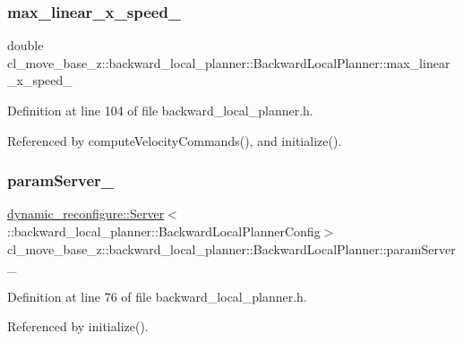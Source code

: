 \subsubsection{\texorpdfstring{max\+\_\+linear\+\_\+x\+\_\+speed\+\_\+}{max\_linear\_x\_speed\_}}
{\footnotesize\ttfamily double cl\+\_\+move\+\_\+base\+\_\+z\+::backward\+\_\+local\+\_\+planner\+::\+Backward\+Local\+Planner\+::max\+\_\+linear\+\_\+x\+\_\+speed\+\_\+\hspace{0.3cm}{\ttfamily [private]}}



Definition at line 104 of file backward\+\_\+local\+\_\+planner.\+h.



Referenced by compute\+Velocity\+Commands(), and initialize().

\mbox{\label{classcl__move__base__z_1_1backward__local__planner_1_1BackwardLocalPlanner_afb349461ce9c4edee018dbb822a8cd9a}} 
\subsubsection{\texorpdfstring{param\+Server\+\_\+}{paramServer\_}}
{\footnotesize\ttfamily \hyperlink{strikes__back_2servers_2led__action__server_2src_2led__action__server__node_8cpp_a2036ae39d23f8e14a2cc8ddcd46dea5a}{dynamic\+\_\+reconfigure\+::\+Server}$<$\+::backward\+\_\+local\+\_\+planner\+::\+Backward\+Local\+Planner\+Config$>$ cl\+\_\+move\+\_\+base\+\_\+z\+::backward\+\_\+local\+\_\+planner\+::\+Backward\+Local\+Planner\+::param\+Server\+\_\+\hspace{0.3cm}{\ttfamily [private]}}



Definition at line 76 of file backward\+\_\+local\+\_\+planner.\+h.



Referenced by initialize().

